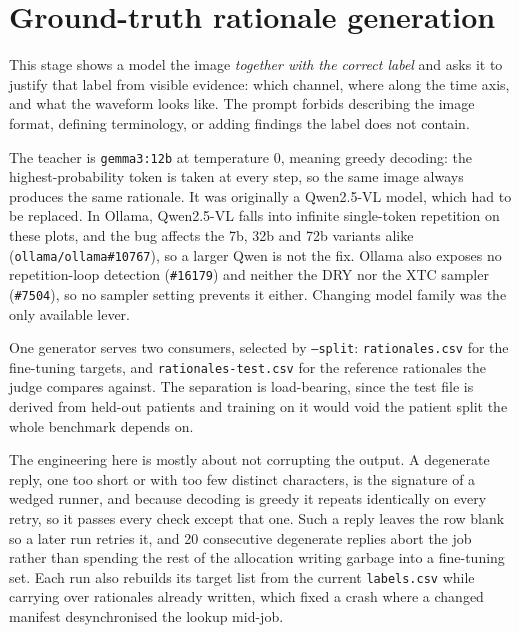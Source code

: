 \documentclass[11pt,a4paper]{article}
\newcommand{\file}[1]{{\small\texttt{#1}}}
\begin{document}
\section{Ground-truth rationale generation}

This stage shows a model the image \emph{together with the correct label} and
asks it to justify that label from visible evidence: which channel, where along
the time axis, and what the waveform looks like. The prompt forbids describing
the image format, defining terminology, or adding findings the label does not
contain.

The teacher is \texttt{gemma3:12b} at temperature 0, meaning greedy decoding:
the highest-probability token is taken at every step, so the same image always
produces the same rationale. It was originally a Qwen2.5-VL model, which had to
be replaced. In Ollama, Qwen2.5-VL falls into infinite single-token repetition on
these plots, and the bug affects the 7b, 32b and 72b variants alike
(\texttt{ollama/ollama\#10767}), so a larger Qwen is not the fix. Ollama also
exposes no repetition-loop detection (\texttt{\#16179}) and neither the DRY nor
the XTC sampler (\texttt{\#7504}), so no sampler setting prevents it either.
Changing model family was the only available lever.

One generator serves two consumers, selected by \texttt{--split}:
\file{rationales.csv} for the fine-tuning targets, and
\file{rationales-test.csv} for the reference rationales the judge compares
against. The separation is load-bearing, since the test file is derived from
held-out patients and training on it would void the patient split the whole
benchmark depends on.

The engineering here is mostly about not corrupting the output. A degenerate
reply, one too short or with too few distinct characters, is the signature of a
wedged runner, and because decoding is greedy it repeats identically on every
retry, so it passes every check except that one. Such a reply leaves the row blank
so a later run retries it, and 20 consecutive degenerate replies abort the job
rather than spending the rest of the allocation writing garbage into a
fine-tuning set. Each run also rebuilds its target list from the current
\file{labels.csv} while carrying over rationales already written, which fixed a
crash where a changed manifest desynchronised the lookup mid-job.
\end{document}
